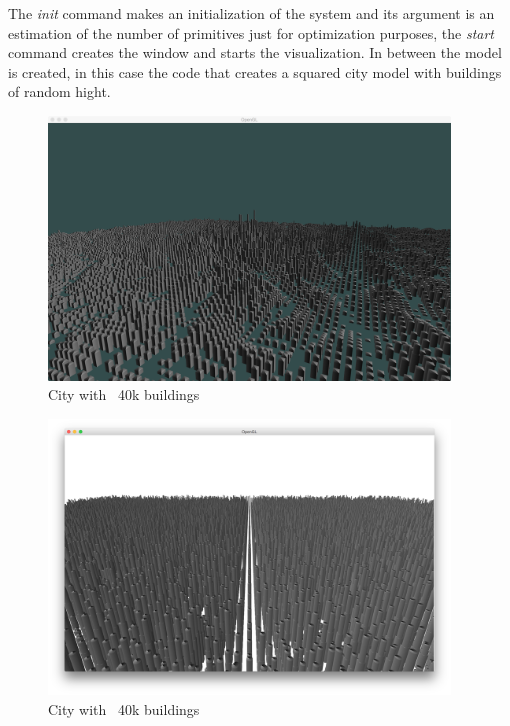 The \emph{init} command makes an initialization of the system and its argument is an estimation of the number of primitives just for optimization purposes, the \emph{start} command creates the window and starts the visualization. In between the model is created, in this case the code that creates a squared city model with buildings of random hight.

\begin{figure}[htb]
	\centering
	\includegraphics[width=0.95\textwidth]{img/Solution/City2-100*100.png}
	\caption{City with ~40k buildings}
	\label{fig:pic1}
\end{figure}

\colocarFiguramaisRodada

\begin{figure}[htb]
	\centering
	\includegraphics[width=0.95\textwidth]{img/Solution/City4-racket.png}
	\caption{City with ~40k buildings}
	\label{fig:pic1}
\end{figure}



